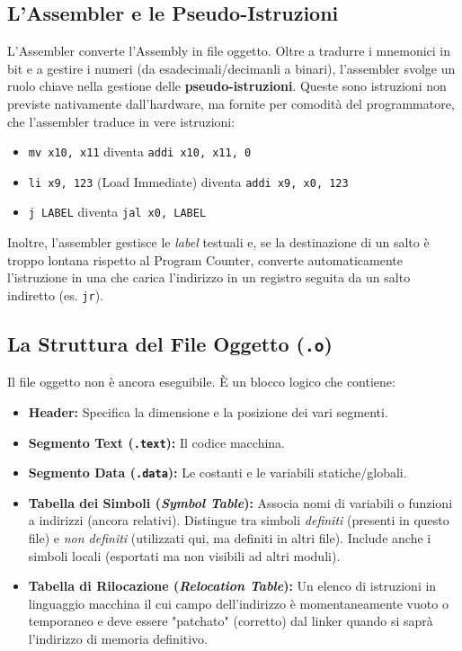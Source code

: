 \documentclass[12pt, a4paper]{article}
\begin{document}
\subsection{L'Assembler e le Pseudo-Istruzioni}
L'Assembler converte l'Assembly in file oggetto. Oltre a tradurre i mnemonici in bit e a gestire i numeri (da esadecimali/decimanli a binari), l'assembler svolge un ruolo chiave nella gestione delle \textbf{pseudo-istruzioni}.
Queste sono istruzioni non previste nativamente dall'hardware, ma fornite per comodità del programmatore, che l'assembler traduce in vere istruzioni:

\begin{itemize}
    \item \texttt{mv x10, x11} diventa \texttt{addi x10, x11, 0}
    \item \texttt{li x9, 123} (Load Immediate) diventa \texttt{addi x9, x0, 123}
    \item \texttt{j LABEL} diventa \texttt{jal x0, LABEL}
\end{itemize}
Inoltre, l'assembler gestisce le \textit{label} testuali e, se la destinazione di un salto è troppo lontana rispetto al Program Counter, converte automaticamente l'istruzione in una che carica l'indirizzo in un registro seguita da un salto indiretto (es. \texttt{jr}).

\subsection{La Struttura del File Oggetto (\texttt{.o})}
Il file oggetto non è ancora eseguibile. È un blocco logico che contiene:
\begin{itemize}
    \item \textbf{Header:} Specifica la dimensione e la posizione dei vari segmenti.
    \item \textbf{Segmento Text (\texttt{.text}):} Il codice macchina.
    \item \textbf{Segmento Data (\texttt{.data}):} Le costanti e le variabili statiche/globali.
    \item \textbf{Tabella dei Simboli (\textit{Symbol Table}):} Associa nomi di variabili o funzioni a indirizzi (ancora relativi). Distingue tra simboli \textit{definiti} (presenti in questo file) e \textit{non definiti} (utilizzati qui, ma definiti in altri file). Include anche i simboli locali (esportati ma non visibili ad altri moduli).
    \item \textbf{Tabella di Rilocazione (\textit{Relocation Table}):} Un elenco di istruzioni in linguaggio macchina il cui campo dell'indirizzo è momentaneamente vuoto o temporaneo e deve essere "patchato" (corretto) dal linker quando si saprà l'indirizzo di memoria definitivo.
\end{itemize}
\end{document}
